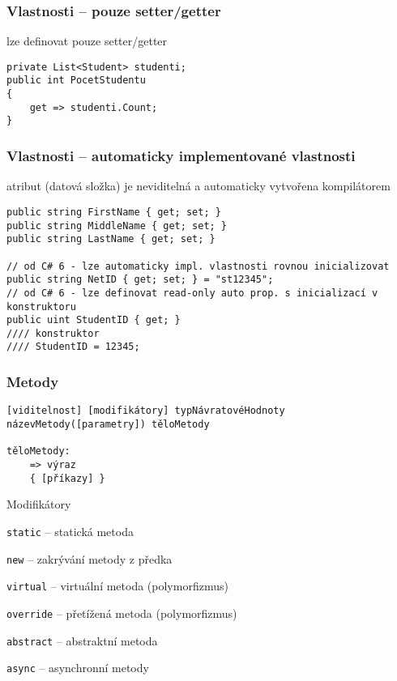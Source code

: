 \begin{frame}[fragile]
\frametitle{Vlastnosti -- pouze setter/getter}
\begin{bitemize}{}
\item lze definovat pouze setter/getter
\end{bitemize}

\begin{yesblock}
\begin{lstlisting}
private List<Student> studenti;
public int PocetStudentu
{
    get => studenti.Count;
}
\end{lstlisting}
\end{yesblock}
\end{frame}


\begin{frame}[fragile]
\frametitle{Vlastnosti -- automaticky implementované vlastnosti}
\begin{bitemize}{}
\item atribut (datová složka) je neviditelná a automaticky vytvořena kompilátorem
\end{bitemize}

\begin{yesblock}
\begin{lstlisting}
public string FirstName { get; set; }
public string MiddleName { get; set; }
public string LastName { get; set; }

// od C# 6 - lze automaticky impl. vlastnosti rovnou inicializovat
public string NetID { get; set; } = "st12345";
// od C# 6 - lze definovat read-only auto prop. s inicializací v konstruktoru
public uint StudentID { get; }
//// konstruktor
//// StudentID = 12345;
\end{lstlisting}
\end{yesblock}
\end{frame}





\begin{frame}[fragile]
\frametitle{Metody}

\begin{noteblock}{}
\begin{lstlisting}
[viditelnost] [modifikátory] typNávratovéHodnoty názevMetody([parametry]) těloMetody

těloMetody:
	=> výraz
	{ [příkazy] }
\end{lstlisting}
\end{noteblock}

\begin{bitemize}{Modifikátory}
\item \lstinline|static| -- statická metoda
\item \lstinline|new| -- zakrývání metody z předka
\item \lstinline|virtual| -- virtuální metoda (polymorfizmus)
\item \lstinline|override| -- přetížená metoda (polymorfizmus)
\item \lstinline|abstract| -- abstraktní metoda
\item \lstinline|async| -- asynchronní metody
\end{bitemize}
\end{frame}



